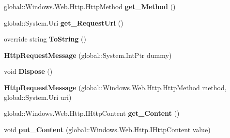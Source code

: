 \begin{DoxyCompactItemize}
global\+::\+Windows.\+Web.\+Http.\+Http\+Method {\bfseries get\+\_\+\+Method} ()
\item 
\mbox{\label{class_windows_1_1_web_1_1_http_1_1_http_request_message_a60eee69978be3f99e85a37b7bf05850d}} 
global\+::\+System.\+Uri {\bfseries get\+\_\+\+Request\+Uri} ()
\item 
\mbox{\label{class_windows_1_1_web_1_1_http_1_1_http_request_message_a311ec1966990d2a837636dfe734907f3}} 
override string {\bfseries To\+String} ()
\item 
\mbox{\label{class_windows_1_1_web_1_1_http_1_1_http_request_message_a266f73c079be0dd9c1b831b69dd1731e}} 
{\bfseries Http\+Request\+Message} (global\+::\+System.\+Int\+Ptr dummy)
\item 
\mbox{\label{class_windows_1_1_web_1_1_http_1_1_http_request_message_a45b7a3697d6f36e790546f21c5011670}} 
void {\bfseries Dispose} ()
\item 
\mbox{\label{class_windows_1_1_web_1_1_http_1_1_http_request_message_a59606adfc5f01047a058c7802520488d}} 
{\bfseries Http\+Request\+Message} (global\+::\+Windows.\+Web.\+Http.\+Http\+Method method, global\+::\+System.\+Uri uri)
\item 
\mbox{\label{class_windows_1_1_web_1_1_http_1_1_http_request_message_a2d95b5c161ea61544f6c82430b9bef3d}} 
global\+::\+Windows.\+Web.\+Http.\+I\+Http\+Content {\bfseries get\+\_\+\+Content} ()
\item 
\mbox{\label{class_windows_1_1_web_1_1_http_1_1_http_request_message_aef2c0a57c9fe364d410c4ea568aa1406}} 
void {\bfseries put\+\_\+\+Content} (global\+::\+Windows.\+Web.\+Http.\+I\+Http\+Content value)
\item 
\mbox{\label{class_windows_1_1_web_1_1_http_1_1_http_request_message_a7954249df0daf81ada6573d24a237db8}} 

\end{DoxyCompactItemize}
